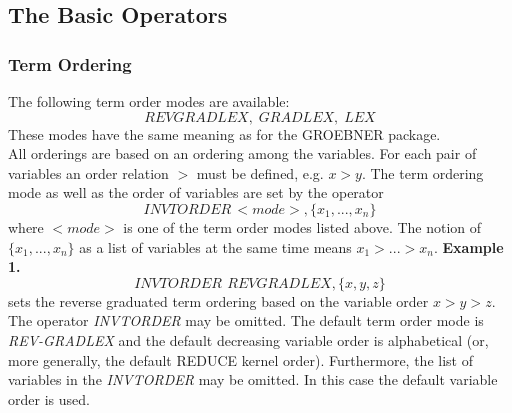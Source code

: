 \subsection{The Basic Operators}
\subsubsection{Term Ordering}
The following term order modes are available:
\[ REVGRADLEX,\; GRADLEX,\; LEX \]
These modes have the same meaning as for the GROEBNER package.\\
All orderings are based on an ordering among the variables.
For each pair of variables an order relation $>$ must be defined,
e.g. $x>y$. The term ordering mode as well as the order of variables
are set by the operator
\[ INVTORDER\,<mode>,\{x_1,...,x_n\} \]
where $<mode>$ is one of the term order modes listed above.
The notion of $\{x_1,...,x_n\}$ as a list of variables
at the same time means $x_1>...>x_n$.
\vskip 0.1cm
\noindent
{\bf Example 1.}
\[ INVTORDER\>\,REVGRADLEX,\{x,y,z\} \]
sets the reverse graduated term ordering based on the variable
order $x>y>z$.\\
The operator \emph{INVTORDER} may be omitted. The default term order mode
is \emph{REV-GRADLEX} and the default decreasing variable order is
alphabetical (or, more generally, the default REDUCE kernel order).
Furthermore, the list of variables in the \emph{INVTORDER} may be omitted.
In this case the default variable order is used.
